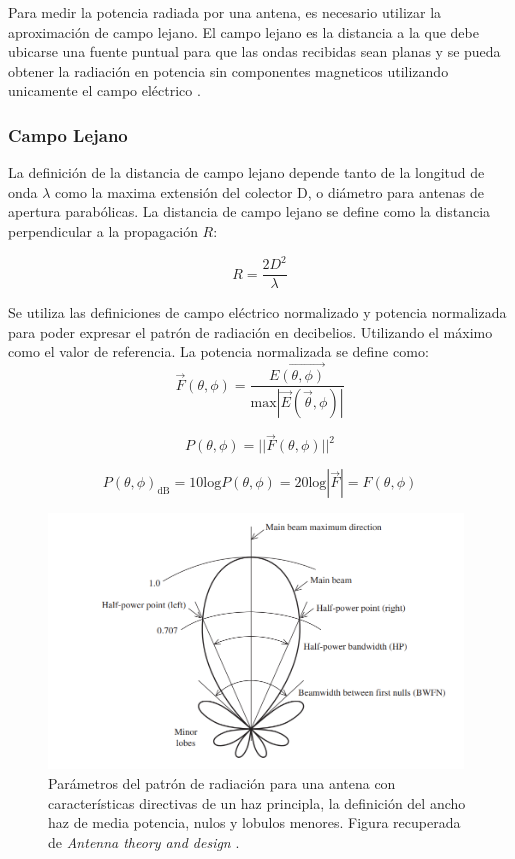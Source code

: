 Para medir la potencia radiada por una antena, es necesario utilizar la aproximación de campo lejano. El campo lejano es la distancia a la que debe ubicarse una fuente puntual para que las ondas recibidas sean planas y se pueda obtener la radiación en potencia sin componentes magneticos utilizando unicamente el campo eléctrico \cite{Ransom2016}.\\

\subsubsection*{Campo Lejano} La definición de la distancia de campo lejano depende tanto de la longitud de onda $\lambda$ como la maxima extensión del colector D, o diámetro para antenas de apertura parabólicas. La distancia de campo lejano se define como la distancia perpendicular a la propagación $R$:

\begin{equation}
    R = \frac{2D^2}{\lambda}
\end{equation}

Se utiliza las definiciones de campo eléctrico normalizado y potencia normalizada para poder expresar el patrón de radiación en decibelios. Utilizando el máximo como el valor de referencia. La potencia normalizada se define como:\\

\begin{equation}
    \Vec{F}(\theta, \phi)=\frac{\Vec{E(\theta, \phi)}}{\text{max}|\Vec{E}(\Vec{\theta}, \phi)|}
\end{equation}

\begin{equation}
    P(\theta, \phi) = ||\Vec{F}(\theta, \phi)||^{2}
\end{equation}

\begin{equation}
    P(\theta, \phi)_{\text{dB}} = 10\text{log}P(\theta, \phi)=20\text{log} |\Vec{F}|=F(\theta, \phi)
\end{equation}


\begin{figure}
    \centering
    \includegraphics[width = 11cm]{img/patern1.png}
    \caption{Parámetros del patrón de radiación para una antena con características directivas de un haz principla, la definición del ancho haz de media potencia, nulos y lobulos menores. Figura recuperada de \textit{Antenna theory and design} \cite{stutzman2012antenna}.}
    \label{fig:patern}
\end{figure}

